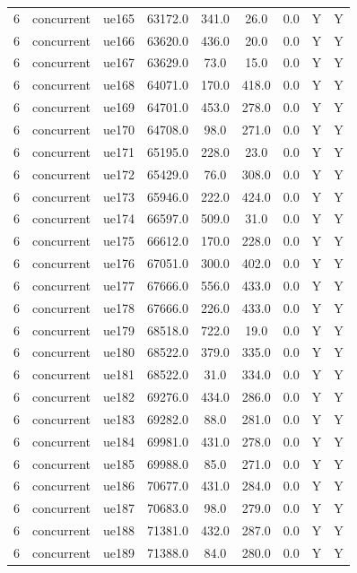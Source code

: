 \begin{table}[ht]
\begin{tabular}{|c|c|c|c|c|c|c|c|c|}
6 & concurrent & ue165 & 63172.0 & 341.0 & 26.0 & 0.0 & Y & Y \\
6 & concurrent & ue166 & 63620.0 & 436.0 & 20.0 & 0.0 & Y & Y \\
6 & concurrent & ue167 & 63629.0 & 73.0 & 15.0 & 0.0 & Y & Y \\
6 & concurrent & ue168 & 64071.0 & 170.0 & 418.0 & 0.0 & Y & Y \\
6 & concurrent & ue169 & 64701.0 & 453.0 & 278.0 & 0.0 & Y & Y \\
6 & concurrent & ue170 & 64708.0 & 98.0 & 271.0 & 0.0 & Y & Y \\
6 & concurrent & ue171 & 65195.0 & 228.0 & 23.0 & 0.0 & Y & Y \\
6 & concurrent & ue172 & 65429.0 & 76.0 & 308.0 & 0.0 & Y & Y \\
6 & concurrent & ue173 & 65946.0 & 222.0 & 424.0 & 0.0 & Y & Y \\
6 & concurrent & ue174 & 66597.0 & 509.0 & 31.0 & 0.0 & Y & Y \\
6 & concurrent & ue175 & 66612.0 & 170.0 & 228.0 & 0.0 & Y & Y \\
6 & concurrent & ue176 & 67051.0 & 300.0 & 402.0 & 0.0 & Y & Y \\
6 & concurrent & ue177 & 67666.0 & 556.0 & 433.0 & 0.0 & Y & Y \\
6 & concurrent & ue178 & 67666.0 & 226.0 & 433.0 & 0.0 & Y & Y \\
6 & concurrent & ue179 & 68518.0 & 722.0 & 19.0 & 0.0 & Y & Y \\
6 & concurrent & ue180 & 68522.0 & 379.0 & 335.0 & 0.0 & Y & Y \\
6 & concurrent & ue181 & 68522.0 & 31.0 & 334.0 & 0.0 & Y & Y \\
6 & concurrent & ue182 & 69276.0 & 434.0 & 286.0 & 0.0 & Y & Y \\
6 & concurrent & ue183 & 69282.0 & 88.0 & 281.0 & 0.0 & Y & Y \\
6 & concurrent & ue184 & 69981.0 & 431.0 & 278.0 & 0.0 & Y & Y \\
6 & concurrent & ue185 & 69988.0 & 85.0 & 271.0 & 0.0 & Y & Y \\
6 & concurrent & ue186 & 70677.0 & 431.0 & 284.0 & 0.0 & Y & Y \\
6 & concurrent & ue187 & 70683.0 & 98.0 & 279.0 & 0.0 & Y & Y \\
6 & concurrent & ue188 & 71381.0 & 432.0 & 287.0 & 0.0 & Y & Y \\
6 & concurrent & ue189 & 71388.0 & 84.0 & 280.0 & 0.0 & Y & Y \\

\end{tabular}
\end{table}
